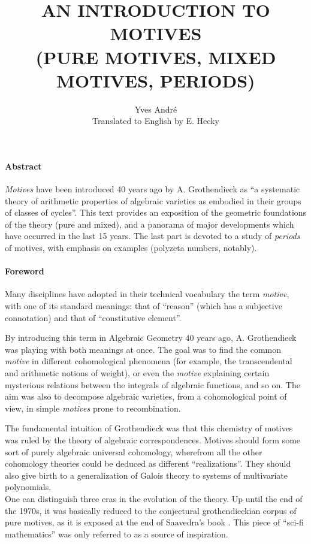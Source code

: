 \documentclass[12pt]{book}
\title{AN INTRODUCTION TO MOTIVES\\(PURE MOTIVES, MIXED MOTIVES, PERIODS)}
\author{Yves André\\Translated to English by E. Hecky}
\newcommand{\1}{\mathbf{1}}
\begin{document}
\maketitle

\paragraph*{Abstract}

\emph{Motives} have been introduced 40 years ago by A. Grothendieck as \enquote{a systematic theory of arithmetic properties of algebraic varieties as embodied in their groups of classes of cycles}. 
This text provides an exposition of the geometric foundations of the theory (pure and mixed), and a panorama of major developments which have occurred in the last 15 years.
The last part is devoted to a study of \emph{periods} of motives, with emphasis on examples (polyzeta numbers, notably).

\paragraph*{Foreword}

Many disciplines have adopted in their technical vocabulary the term \emph{motive}, with one of its standard meanings: that of \enquote{reason} (which has a subjective connotation) and that of \enquote{constitutive element}.

By introducing this term in Algebraic Geometry 40 years ago, A. Grothendieck was playing with both meanings at once.
The goal was to find the common \emph{motive} in different cohomological phenomena (for example, the transcendental and arithmetic notions of weight), or even the \emph{motive} explaining certain mysterious relations between the integrals of algebraic functions, and so on.
The aim was also to decompose algebraic varieties, from a cohomological point of view, in simple \emph{motives} prone to recombination.

The fundamental intuition of Grothendieck was that this chemistry of motives was ruled by the theory of algebraic correspondences.
Motives should form some sort of purely algebraic universal cohomology, wherefrom all the other cohomology theories could be deduced as different \enquote{realizations}.
They should also give birth to a generalization of Galois theory to systems of multivariate polynomials.\\



One can distinguish three eras in the evolution of the theory.
Up until the end of the 1970s, it was basically reduced to the conjectural grothendieckian corpus of pure motives, as it is exposed at the end of Saavedra's book \cite{saavedra72}.
This piece of \enquote{sci-fi mathematics} was only referred to as a source of inspiration.
\end{document}
